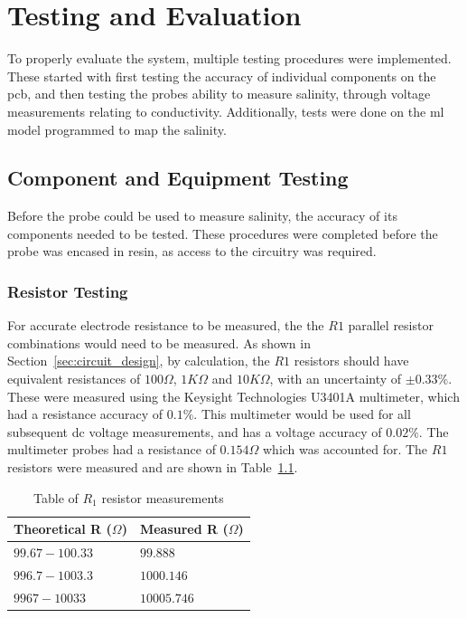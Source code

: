 \chapter{Testing and Evaluation}

To properly evaluate the system, multiple testing procedures were implemented.
These started with first testing the accuracy of individual components on the \gls{pcb}, and then testing the probes ability to measure salinity, through voltage measurements relating to conductivity.
Additionally, tests were done on the \gls{ml} model programmed to map the salinity.

\section{Component and Equipment Testing}
Before the probe could be used to measure salinity, the accuracy of its components needed to be tested.
These procedures were completed before the probe was encased in resin, as access to the circuitry was required.

\subsection{Resistor Testing}
For accurate electrode resistance to be measured, the the $R1$ parallel resistor combinations would need to be measured.
As shown in Section~\ref{sec:circuit_design}, by calculation, the $R1$ resistors should have equivalent resistances of $100\Omega$, $1K\Omega$ and $10K\Omega$, with an uncertainty of $\pm0.33\%$.
These were measured using the Keysight Technologies U3401A multimeter, which had a resistance accuracy of $0.1\%$.
This multimeter would be used for all subsequent \gls{dc} voltage measurements, and has a voltage accuracy of $0.02\%$.
The multimeter probes had a resistance of $0.154\Omega$ which was accounted for.
The $R1$ resistors were measured and are shown in Table~\ref{table:resistance_test}.


\begingroup
    \renewcommand{\arraystretch}{1.8} %
    \begin{table}[h!]
        \centering
            \begin{tabular}{|>{\centering\arraybackslash}p{5cm}|
                >{\centering\arraybackslash}m{5cm}|}
            \hline
            Theoretical R ($\Omega$) & Measured R ($\Omega$) \\ \hline
            $99.67-100.33$ & $99.888$ \\ \hline
            $996.7-1003.3$ & $1000.146$ \\ \hline
            $9967-10033$ & $10005.746$ \\ \hline
            \end{tabular}
        \caption{Table of $R_1$ resistor measurements}
        \label{table:resistance_test}
    \end{table}
\endgroup

